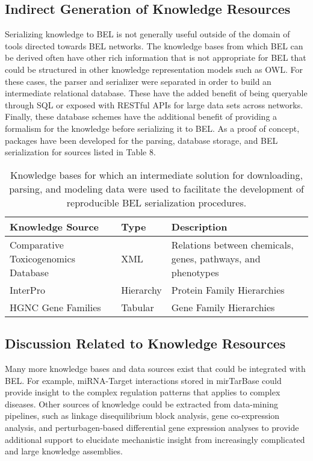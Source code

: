 \subsection{Indirect Generation of Knowledge Resources}

Serializing knowledge to \ac{BEL} is not generally useful outside of the domain of tools directed towards \ac{BEL} networks.  The knowledge bases from which \ac{BEL} can be derived often have other rich information that is not appropriate for \ac{BEL} that could be structured in other knowledge representation models such as \ac{OWL}. For these cases, the parser and serializer were separated in order to build an intermediate relational database. These have the added benefit of being queryable through \ac{SQL} or exposed with RESTful \ac{API}s for large data sets across networks. Finally, these database schemes have the additional benefit of providing a formalism for the knowledge before serializing it to BEL. As a proof of concept, packages have been developed for the parsing, database storage, and BEL serialization for sources listed in Table 8.

\begin{table}
\centering
\caption[Indirect Knowledge Resource Generation]{Knowledge bases for which an intermediate solution for downloading, parsing, and modeling data were used to facilitate the development of reproducible BEL serialization procedures.}
\label{tab:indirect_knowledge_generation}
\def\arraystretch{1.5}
\begin{tabular}{p{25mm} p{20mm} p{45mm}}
Knowledge Source & Type & Description \\
\hline
Comparative Toxicogenomics Database & \ac{XML} & Relations between chemicals, genes, pathways, and phenotypes \\
InterPro & Hierarchy & Protein Family Hierarchies \\
HGNC Gene Families & Tabular & Gene Family Hierarchies
\end{tabular}
\end{table}

\subsection{Discussion Related to Knowledge Resources}

Many more knowledge bases and data sources exist that could be integrated with \ac{BEL}. For example, \ac{miRNA}-Target interactions stored in mirTarBase \cite{Chou2016} could provide insight to the complex regulation patterns that applies to complex diseases. Other sources of knowledge could be extracted from data-mining pipelines, such as linkage disequilibrium block analysis, gene co-expression analysis, and perturbagen-based differential gene expression analyses to provide additional support to elucidate mechanistic insight from increasingly complicated and large knowledge assemblies.
